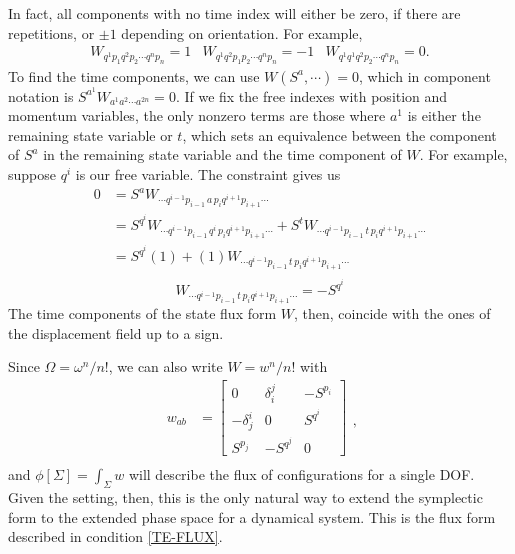 \documentclass[nofootinbib,aps,pre]{revtex4-2}
\begin{document}
In fact, all components with no time index will either be zero, if there are repetitions, or $\pm 1$ depending on orientation. For example,
\begin{equation}
    \begin{matrix}
        W_{q^1 p_1 q^2 p_2 \cdots q^n p_n} = 1 & W_{q^1 q^2 p_1 p_2 \cdots q^n p_n} = -1 & W_{q^1 q^1 q^2 p_2 \cdots q^n p_n} = 0.
    \end{matrix}
\end{equation}
To find the time components, we can use $W(S^a, \cdots) = 0$, which in component notation is $S^{a^1} W_{a^1 a^2 \cdots a^{2n}} = 0$. If we fix the free indexes with position and momentum variables, the only nonzero terms are those where $a^1$ is either the remaining state variable or $t$, which sets an equivalence between the component of $S^a$ in the remaining state variable and the time component of $W$. For example, suppose $q^i$ is our free variable. The constraint gives us
\begin{equation}
\begin{aligned}
    0 &= S^a W_{\cdots q^{i-1}p_{i-1}\,a\,p_iq^{i+1}p_{i+1}\cdots} \\
    &= S^{q^i} W_{\cdots q^{i-1}p_{i-1}\,q^i\,p_iq^{i+1}p_{i+1}\cdots} + S^t W_{\cdots q^{i-1}p_{i-1}\,t\,p_iq^{i+1}p_{i+1}\cdots} \\
    &= S^{q^i} (1) + (1) W_{\cdots q^{i-1}p_{i-1}\,t\,p_iq^{i+1}p_{i+1}\cdots} \\
\end{aligned}
\end{equation}
\begin{equation}
    W_{\cdots q^{i-1}p_{i-1}\,t\,p_iq^{i+1}p_{i+1}\cdots} = -S^{q^i}
\end{equation}
The time components of the state flux form $W$, then, coincide with the ones of the displacement field up to a sign.

Since $\Omega = \omega^n/n!$, we can also write $W = w^n/n!$ with
\begin{equation}
    \begin{aligned}
    w_{ab} &=
        \begin{bmatrix}
            0 & \delta_i^j & -S^{p_i} \\
            -\delta_j^i & 0 & S^{q^i} \\
            S^{p_j} & -S^{q^j} & 0
        \end{bmatrix} \\
    \end{aligned},
\end{equation}
and $\phi[\Sigma] = \int_{\Sigma} w$ will describe the flux of configurations for a single DOF. Given the setting, then, this is the only natural way to extend the symplectic form to the extended phase space for a dynamical system. This is the flux form described in condition \ref{TE-FLUX}.
\end{document}
